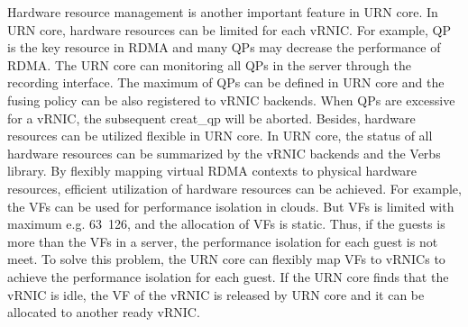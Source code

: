 Hardware resource management is another important feature in URN core. In URN core, hardware resources can be limited for each vRNIC. For example, QP is the key resource in RDMA and many QPs may decrease the performance of RDMA. The URN core can monitoring all QPs in the server through the recording interface. The maximum of QPs can be defined in URN core and the fusing policy can be also registered to vRNIC backends. When QPs are excessive for a vRNIC, the subsequent creat\_qp will be aborted. 
Besides, hardware resources can be utilized flexible in URN core. In URN core, the status of all hardware resources can be summarized by the vRNIC backends and the Verbs library. By flexibly mapping virtual RDMA contexts to physical hardware resources, efficient utilization of hardware resources can be achieved. For example, the VFs can be used for performance isolation in clouds. But VFs is limited with maximum e.g. 63~126, and the allocation of VFs is static. Thus, if the guests is more than the VFs in a server, the performance isolation for each guest is not meet. To solve this problem, the URN core can flexibly map VFs to vRNICs to achieve the performance isolation for each guest. If the URN core finds that the vRNIC is idle, the VF of the vRNIC is released by URN core and it can be allocated to another ready vRNIC.




